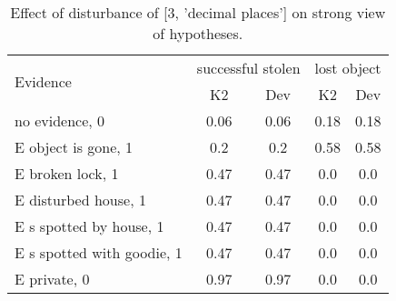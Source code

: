 \begin{table}\begin{tabular}{l|cc|cc}\toprule\multirow{2}{*}{Evidence} & \multicolumn{2}{c}{successful stolen}& \multicolumn{2}{c}{lost object}\\& {K2} & {Dev}& {K2} & {Dev}\\\midrule
no evidence, 0 & 0.06&0.06&0.18&0.18\\E object is gone, 1 & 0.2&0.2&0.58&0.58\\E broken lock, 1 & 0.47&0.47&0.0&0.0\\E disturbed house, 1 & 0.47&0.47&0.0&0.0\\E s spotted by house, 1 & 0.47&0.47&0.0&0.0\\E s spotted with goodie, 1 & 0.47&0.47&0.0&0.0\\E private, 0 & 0.97&0.97&0.0&0.0\\\bottomrule\end{tabular}\caption{Effect of disturbance of [3, 'decimal places'] on strong view of hypotheses.}\end{table}